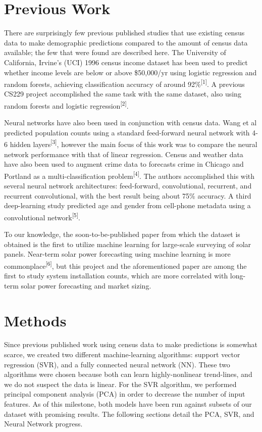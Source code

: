 \documentclass{article}
\begin{document}
	
	\section{Previous Work}
	\label{previous_work}
	
	There are surprisingly few previous published studies that use existing census data to make demographic predictions compared to the amount of census data available; the few that were found are described here. The University of California, Irvine’s (UCI) 1996 census income dataset has been used to predict whether income levels are below or above \$50,000/yr using logistic regression and random forests, achieving classification accuracy of around 92\%\textsuperscript{[1]}. A previous CS229 project accomplished the same task with the same dataset, also using random forests and logistic regression\textsuperscript{[2]}.
	
	Neural networks have also been used in conjunction with census data. Wang et al predicted population counts using a standard feed-forward neural network with 4-6 hidden layers\textsuperscript{[3]}, however the main focus of this work was to compare the neural network performance with that of linear regression. Census and weather data have also been used to augment crime data to forecasts crime in Chicago and Portland as a multi-classification problem\textsuperscript{[4]}. The authors accomplished this with several neural network architectures: feed-forward, convolutional, recurrent, and recurrent convolutional, with the best result being about 75\% accuracy. A third deep-learning study predicted age and gender from cell-phone metadata using a convolutional network\textsuperscript{[5]}. 
	
	To our knowledge, the soon-to-be-published paper from which the dataset is obtained is the first to utilize machine learning for large-scale surveying of solar panels. Near-term solar power forecasting using machine learning is more commonplace\textsuperscript{[6]}, but this project and the aforementioned paper are among the first to study system installation counts, which are more correlated with long-term solar power forecasting and market sizing.
	
	
	\section{Methods}
	
	Since previous published work using census data to make predictions is somewhat scarce, we created two different machine-learning algorithms: support vector regression (SVR), and a fully connected neural network (NN). These two algorithms were chosen because both can learn highly-nonlinear trend-lines, and we do not suspect the data is linear. For the SVR algorithm, we performed principal component analysis (PCA) in order to decrease the number of input features. As of this milestone, both models have been run against subsets of our dataset with promising results. The following sections detail the PCA, SVR, and Neural Network progress.
	
\end{document}
